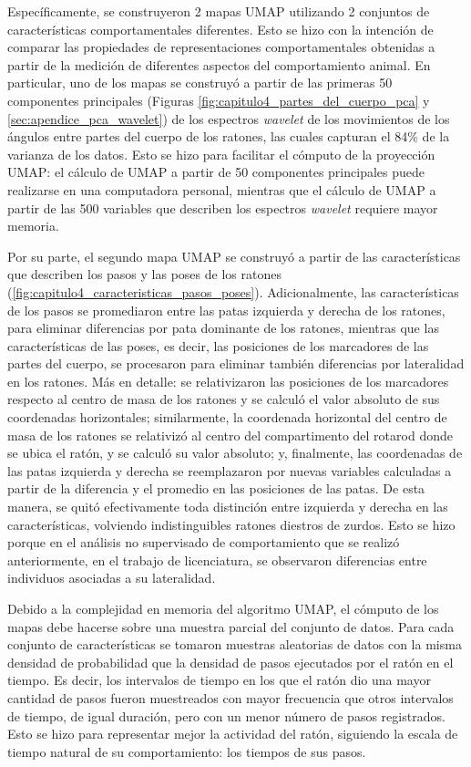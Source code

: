 Específicamente, se construyeron 2 mapas UMAP utilizando 2 conjuntos de características comportamentales diferentes. Esto se hizo con la intención de comparar las propiedades de representaciones comportamentales obtenidas a partir de la medición de diferentes aspectos del comportamiento animal. En particular, uno de los mapas se construyó a partir de las primeras 50 componentes principales (Figuras \ref{fig:capitulo4_partes_del_cuerpo_pca} y \ref{sec:apendice_pca_wavelet}) de los espectros \textit{wavelet} de los movimientos de los ángulos entre partes del cuerpo de los ratones, las cuales capturan el 84\% de la varianza de los datos. Esto se hizo para facilitar el cómputo de la proyección UMAP: el cálculo de UMAP a partir de 50 componentes principales puede realizarse en una computadora personal, mientras que el cálculo de UMAP a partir de las 500 variables que describen los espectros \textit{wavelet} requiere mayor memoria.

Por su parte, el segundo mapa UMAP se construyó a partir de las características que describen los pasos y las poses de los ratones (\autoref{fig:capitulo4_caracteristicas_pasos_poses}). Adicionalmente, las características de los pasos se promediaron entre las patas izquierda y derecha de los ratones, para eliminar diferencias por pata dominante de los ratones, mientras que las características de las poses, es decir, las posiciones de los marcadores de las partes del cuerpo, se procesaron para eliminar también diferencias por lateralidad en los ratones. Más en detalle: se relativizaron las posiciones de los marcadores respecto al centro de masa de los ratones y se calculó el valor absoluto de sus coordenadas horizontales; similarmente, la coordenada horizontal del centro de masa de los ratones se relativizó al centro del compartimento del rotarod donde se ubica el ratón, y se calculó su valor absoluto; y, finalmente, las coordenadas de las patas izquierda y derecha se reemplazaron por nuevas variables calculadas a partir de la diferencia y el promedio en las posiciones de las patas. De esta manera, se quitó efectivamente toda distinción entre izquierda y derecha en las características, volviendo indistinguibles ratones diestros de zurdos. Esto se hizo porque en el análisis no supervisado de comportamiento que se realizó anteriormente, en el trabajo de licenciatura, se observaron diferencias entre individuos asociadas a su lateralidad.

Debido a la complejidad en memoria del algoritmo UMAP, el cómputo de los mapas debe hacerse sobre una muestra parcial del conjunto de datos. Para cada conjunto de características se tomaron muestras aleatorias de datos con la misma densidad de probabilidad que la densidad de pasos ejecutados por el ratón en el tiempo. Es decir, los intervalos de tiempo en los que el ratón dio una mayor cantidad de pasos fueron muestreados con mayor frecuencia que otros intervalos de tiempo, de igual duración, pero con un menor número de pasos registrados. Esto se hizo para representar mejor la actividad del ratón, siguiendo la escala de tiempo natural de su comportamiento: los tiempos de sus pasos.

